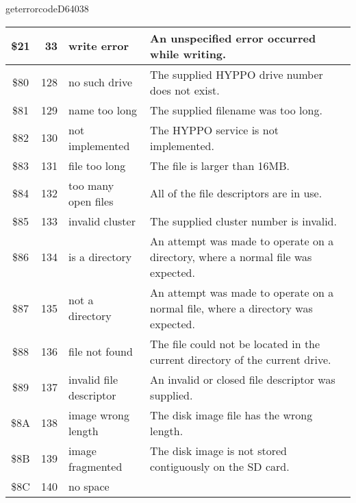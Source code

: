 \begin{hyppotrap}{geterrorcode}{D640}{38}
{\begin{longtable}{|c|r|l|p{8cm}|}
    \\\hline
    \index{HYPPO Error Codes!\$21}
    \$21 & 33 & write error &
    An unspecified error occurred while writing.
    \\\hline
    \index{HYPPO Error Codes!\$80}
    \$80 & 128 & no such drive &
    The supplied HYPPO drive number does not exist.
    \\\hline
    \index{HYPPO Error Codes!\$81}
    \$81 & 129 & {name too long} &
    The supplied filename was too long.
    \\\hline
    \index{HYPPO Error Codes!\$82}
    \$82 & 130 & not implemented &
    The HYPPO service is not implemented.
    \\\hline
    \index{HYPPO Error Codes!\$83}
    \$83 & 131 & file too long &
    The file is larger than 16MB.
    \\\hline
    \index{HYPPO Error Codes!\$84}
    \$84 & 132 & \makecell[tl]{too many\\open files} &
    All of the file descriptors are in use.
    \\\hline
    \index{HYPPO Error Codes!\$85}
    \$85 & 133 & invalid cluster &
    The supplied cluster number is invalid.
    \\\hline
    \index{HYPPO Error Codes!\$86}
    \$86 & 134 & is a directory &
    An attempt was made to operate on a directory, where a normal file was
    expected.
    \\\hline
    \index{HYPPO Error Codes!\$87}
    \$87 & 135 & not a directory &
    An attempt was made to operate on a normal file, where a directory was
    expected.
    \\\hline
    \index{HYPPO Error Codes!\$88}
    \$88 & 136 & file not found &
    The file could not be located in the current directory of the current drive.
    \\\hline
    \index{HYPPO Error Codes!\$89}
    \$89 & 137 & \makecell[tl]{invalid file\\descriptor} &
    An invalid or closed file descriptor was supplied.
    \\\hline
    \index{HYPPO Error Codes!\$8A}
    \$8A & 138 & \makecell[tl]{image wrong\\length} &
    The disk image file has the wrong length.
    \\\hline
    \index{HYPPO Error Codes!\$8B}
    \$8B & 139 & image fragmented &
    The disk image is not stored contiguously on the SD card.
    \\\hline
    \index{HYPPO Error Codes!\$8C}
    \$8C & 140 & no space &

\end{longtable}}
\end{hyppotrap}
